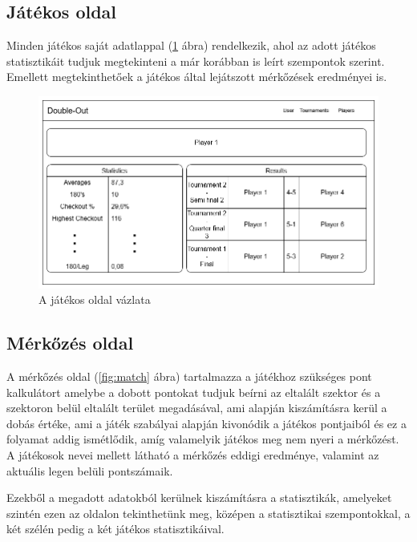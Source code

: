 \subsection{Játékos oldal}
Minden játékos saját adatlappal (\ref{fig:player} ábra) rendelkezik, ahol az adott játékos statisztikáit tudjuk megtekinteni a már korábban is leírt szempontok szerint.
Emellett megtekinthetőek a játékos által lejátszott mérkőzések eredményei is.

\begin{figure}[h]
\centering
\includegraphics[scale=0.5]{images/PlayerPage.png}
\caption{A játékos oldal vázlata}
\label{fig:player}
\end{figure}

\subsection{Mérkőzés oldal}
A mérkőzés oldal (\ref{fig:match} ábra) tartalmazza a játékhoz szükséges pont kalkulátort amelybe a dobott pontokat tudjuk beírni az eltalált szektor és a szektoron belül eltalált terület megadásával, ami alapján kiszámításra kerül a dobás értéke, ami a játék szabályai alapján kivonódik a játékos pontjaiból és ez a folyamat addig ismétlődik, amíg valamelyik játékos meg nem nyeri a mérkőzést. A játékosok nevei mellett látható a mérkőzés eddigi eredménye, valamint az aktuális legen belüli pontszámaik.

Ezekből a megadott adatokból kerülnek kiszámításra a statisztikák, amelyeket szintén ezen az oldalon tekinthetünk meg, középen a statisztikai szempontokkal, a két szélén pedig a két játékos statisztikáival.


